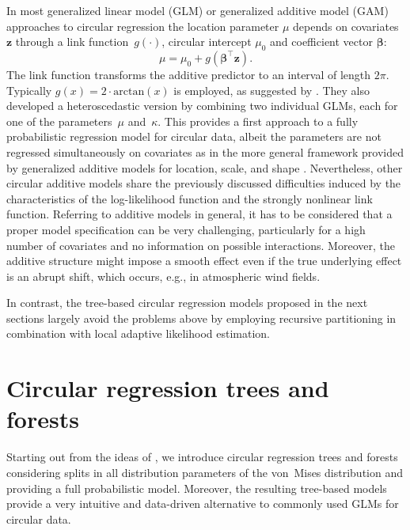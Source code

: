 \documentclass{statsoc}
\begin{document}
In most generalized linear model (GLM) or generalized additive model (GAM)
approaches to circular regression the location parameter $\mu$ depends on
covariates $\mathbf{z}$ through a link function~$g(\cdot)$, circular intercept
$\mu_0$ and coefficient vector $\mathbf{\beta}$: \begin{equation} \mu = \mu_0 +
g\left(\mathbf{\beta}^{\top} \mathbf{z}\right). \end{equation} The link
function transforms the additive predictor to an interval of length $2\pi$.
Typically $g(x) = 2\cdot \text{arctan}(x)$ is employed, as suggested by
\citet{Fisher+Lee:1992}. They also developed a heteroscedastic version by
combining two individual GLMs, each for one of the parameters~$\mu$ and~$\kappa$. 
This provides a first approach to a fully probabilistic regression
model for circular data, albeit the parameters are not regressed simultaneously
on covariates as in the more general framework provided by generalized additive
models for location, scale, and shape \citep[GAMLSS,
][]{Rigby+Stasinopoulos:2005}. Nevertheless, other circular additive models
share the previously discussed difficulties induced by the characteristics of
the log-likelihood function and the strongly nonlinear link function. Referring
to additive models in general, it has to be considered that a proper model
specification can be very challenging, particularly for a high number of
covariates and no information on possible interactions. Moreover, the additive
structure might impose a smooth effect even if the true underlying effect is an
abrupt shift, which occurs, e.g., in atmospheric wind fields.

In contrast, the tree-based circular regression models proposed in the next
sections largely avoid the problems above by employing recursive partitioning
in combination with local adaptive likelihood estimation.


\section{Circular regression trees and forests}
\label{sec:tree_forest}

Starting out from the ideas of \citet{Lund:2002}, we introduce circular
regression trees and forests considering splits in all distribution parameters
of the von~Mises distribution and providing a full probabilistic model.
Moreover, the resulting tree-based models provide a very intuitive and
data-driven alternative to commonly used GLMs for circular data.
\end{document}
